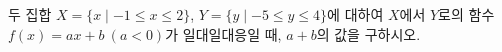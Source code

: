 두 집합 $X=\{x \mid -1\le x\le 2\}$, $Y=\{y \mid -5\le y\le 4\}$에 대하여 $X$에서 $Y$로의 함수 $f(x)=ax+b\ (a<0)$가 일대일대응일 때, $a+b$의 값을 구하시오. 
